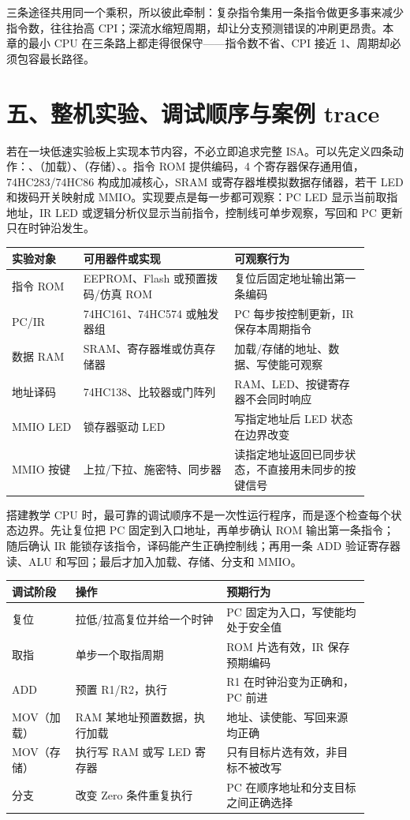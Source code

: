 三条途径共用同一个乘积，所以彼此牵制：复杂指令集用一条指令做更多事来减少指令数，往往抬高 CPI；深流水缩短周期，却让分支预测错误的冲刷更昂贵。本章的最小 CPU 在三条路上都走得很保守——指令数不省、CPI 接近 1、周期却必须包容最长路径。

\section{五、整机实验、调试顺序与案例 trace}

若在一块低速实验板上实现本节内容，不必立即追求完整 ISA。可以先定义四条动作：、（加载）、（存储）、。指令 ROM 提供编码，4 个寄存器保存通用值，74HC283/74HC86 构成加减核心，SRAM 或寄存器堆模拟数据存储器，若干 LED 和拨码开关映射成 MMIO。实现要点是每一步都可观察：PC LED 显示当前取指地址，IR LED 或逻辑分析仪显示当前指令，控制线可单步观察，写回和 PC 更新只在时钟沿发生。

\begin{longtable}{L{0.18\linewidth}L{0.38\linewidth}L{0.34\linewidth}}
\toprule
实验对象 & 可用器件或实现 & 可观察行为 \\
\midrule
指令 ROM & EEPROM、Flash 或预置拨码/仿真 ROM & 复位后固定地址输出第一条编码 \\
PC/IR & 74HC161、74HC574 或触发器组 & PC 每步按控制更新，IR 保存本周期指令 \\
数据 RAM & SRAM、寄存器堆或仿真存储器 & 加载/存储的地址、数据、写使能可观察 \\
地址译码 & 74HC138、比较器或门阵列 & RAM、LED、按键寄存器不会同时响应 \\
MMIO LED & 锁存器驱动 LED & 写指定地址后 LED 状态在边界改变 \\
MMIO 按键 & 上拉/下拉、施密特、同步器 & 读指定地址返回已同步状态，不直接用未同步的按键信号 \\
\bottomrule
\end{longtable}

搭建教学 CPU 时，最可靠的调试顺序不是一次性运行程序，而是逐个检查每个状态边界。先让复位把 PC 固定到入口地址，再单步确认 ROM 输出第一条指令；随后确认 IR 能锁存该指令，译码能产生正确控制线；再用一条 ADD 验证寄存器读、ALU 和写回；最后才加入加载、存储、分支和 MMIO。

\begin{longtable}{L{0.16\linewidth}L{0.38\linewidth}L{0.36\linewidth}}
\toprule
调试阶段 & 操作 & 预期行为 \\
\midrule
复位 & 拉低/拉高复位并给一个时钟 & PC 固定为入口，写使能均处于安全值 \\
取指 & 单步一个取指周期 & ROM 片选有效，IR 保存预期编码 \\
ADD & 预置 R1/R2，执行  & R1 在时钟沿变为正确和，PC 前进 \\
MOV（加载） & RAM 某地址预置数据，执行加载 & 地址、读使能、写回来源均正确 \\
MOV（存储） & 执行写 RAM 或写 LED 寄存器 & 只有目标片选有效，非目标不被改写 \\
分支 & 改变 Zero 条件重复执行 & PC 在顺序地址和分支目标之间正确选择 \\
\bottomrule
\end{longtable}

